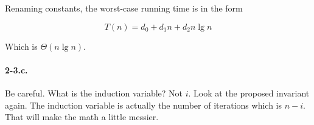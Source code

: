 \documentclass{article}
\begin{document}
\noindent
Renaming constants, the worst-case running time is
in the form

\[
T(n) = d_0 + d_1 n + d_2 n \lg n
\]

\noindent
Which is $\Theta(n \lg n)$.


\vfill   
\pagebreak

\paragraph{2-3.c.}
Be careful. What is the induction variable?
Not $i$. Look at the proposed invariant again.
The induction variable is actually the number of iterations 
which is $n-i$.
That will make the math a little messier.
\end{document}
